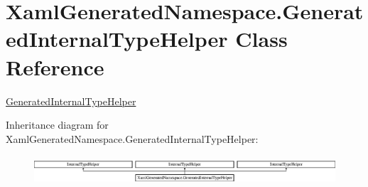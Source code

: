 \hypertarget{class_xaml_generated_namespace_1_1_generated_internal_type_helper}{}\section{Xaml\+Generated\+Namespace.\+Generated\+Internal\+Type\+Helper Class Reference}
\label{class_xaml_generated_namespace_1_1_generated_internal_type_helper}


\mbox{\hyperlink{class_xaml_generated_namespace_1_1_generated_internal_type_helper}{Generated\+Internal\+Type\+Helper}}  


Inheritance diagram for Xaml\+Generated\+Namespace.\+Generated\+Internal\+Type\+Helper\+:\begin{figure}[H]
\begin{center}
\leavevmode
\includegraphics[height=1.085271cm]{dc/db0/class_xaml_generated_namespace_1_1_generated_internal_type_helper}
\end{center}
\end{figure}
